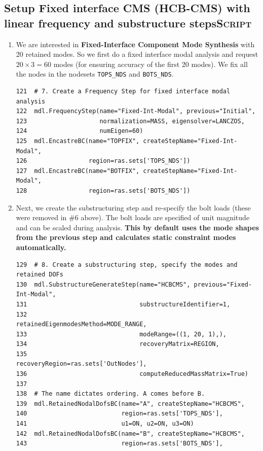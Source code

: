 \documentclass[11pt]{article}
\begin{document}
\subsection{Setup Fixed interface CMS (HCB-CMS) with linear frequency and substructure steps\hfill{}\textsc{Script}}
\label{sec:org2689e78}
\begin{enumerate}
\item We are interested in \textbf{Fixed-Interface Component Mode Synthesis} with 20 retained modes.
So we first do a fixed interface modal analysis and request \(20\times3 = 60\) modes (for ensuring accuracy of the first 20 modes).
We fix all the nodes in the nodesets \texttt{TOPS\_NDS} and \texttt{BOTS\_NDS}.
\begin{verbatim}
121  # 7. Create a Frequency Step for fixed interface modal analysis
122  mdl.FrequencyStep(name="Fixed-Int-Modal", previous="Initial",
123                    normalization=MASS, eigensolver=LANCZOS,
124                    numEigen=60)
125  mdl.EncastreBC(name="TOPFIX", createStepName="Fixed-Int-Modal",
126                 region=ras.sets['TOPS_NDS'])
127  mdl.EncastreBC(name="BOTFIX", createStepName="Fixed-Int-Modal",
128                 region=ras.sets['BOTS_NDS'])
\end{verbatim}
\item Next, we create the substructuring step and re-specify the bolt loads (these were removed in \#6 above).
The bolt loads are specified of unit magnitude and can be scaled during analysis.
\textbf{This by default uses the mode shapes from the previous step and calculates static constraint modes automatically.}
\begin{verbatim}
129  # 8. Create a substructuring step, specify the modes and retained DOFs
130  mdl.SubstructureGenerateStep(name="HCBCMS", previous="Fixed-Int-Modal",
131                               substructureIdentifier=1, 
132                               retainedEigenmodesMethod=MODE_RANGE,
133                               modeRange=((1, 20, 1),),
134                               recoveryMatrix=REGION,
135                               recoveryRegion=ras.sets['OutNodes'],
136                               computeReducedMassMatrix=True)
137  
138  # The name dictates ordering. A comes before B.
139  mdl.RetainedNodalDofsBC(name="A", createStepName="HCBCMS", 
140                          region=ras.sets['TOPS_NDS'], 
141                          u1=ON, u2=ON, u3=ON)
142  mdl.RetainedNodalDofsBC(name="B", createStepName="HCBCMS", 
143                          region=ras.sets['BOTS_NDS'], 

\end{verbatim}
\end{enumerate}
\end{document}
